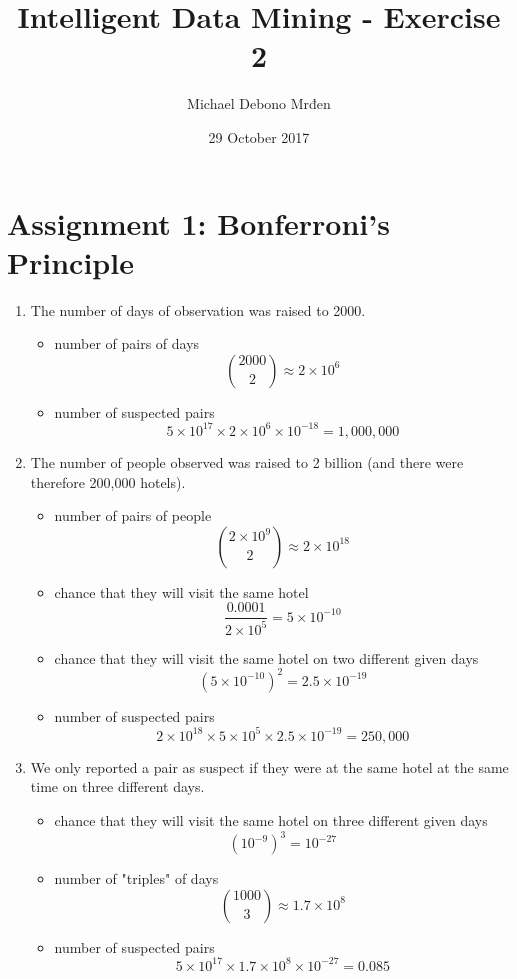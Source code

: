 \documentclass{article}
\title{Intelligent Data Mining - Exercise 2}
\author{\fontencoding{T1}\selectfont Michael Debono Mrđen}
\date{29 October 2017}
\begin{document}
\maketitle

\section{Assignment 1: Bonferroni's Principle}
\renewcommand{\labelenumi}{\alph{enumi}.}
\renewcommand{\labelenumii}{(\alph{enumii})}
\begin{enumerate}
\item{The number of days of observation was raised to 2000.
\begin{itemize}
\item{number of pairs of days
\[ \binom{2000}{2} \approx 2 \times 10^6 \]}
\item{number of suspected pairs
\[ 5 \times 10^{17} \times 2 \times 10^6 \times 10^{-18} = 1,000,000 \]}
\end{itemize}
}

\item{The number of people observed was raised to 2 billion (and there were therefore 200,000 hotels).
\begin{itemize}
\item{number of pairs of people
\[ \binom{2 \times 10^9}{2} \approx 2 \times 10^{18} \]}
\item{chance that they will visit the same hotel
\[ \frac{0.0001}{2 \times 10^5} = 5 \times 10^{-10} \]}
\item{chance that they will visit the same hotel on two different given days
\[ (5 \times 10^{-10})^2 = 2.5 \times 10^{-19} \]}
\item{number of suspected pairs
\[ 2 \times 10^{18} \times 5 \times 10^5 \times 2.5 \times 10^{-19} = 250,000 \]}
\end{itemize}
}

\item{We only reported a pair as suspect if they were at the same hotel at the same time on three different days.
\begin{itemize}
\item{chance that they will visit the same hotel on three different given days
\[ (10^{-9})^3 = 10^{-27} \]}
\item{number of "triples" of days
\[ \binom{1000}{3} \approx 1.7 \times 10^8 \]}
\item{number of suspected pairs
\[ 5 \times 10^{17} \times 1.7 \times 10^8 \times 10^{-27} = 0.085 \]}
\end{itemize}
}
\end{enumerate}
\end{document}
